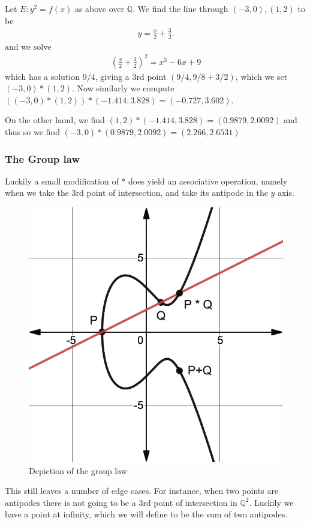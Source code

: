 \begin{counterexample} \label{counterexample:notAssociative}
  Let $E: y^2 = f(x)$ as above over $\mathbb{Q}$.
  We find the line through $(-3, 0), (1,2)$ to be
  \begin{align*}
    y = \frac{x}{2} + \frac{3}{2}.
  \end{align*}
  and we solve
  \begin{align*}
    \left(\frac{x}{2} + \frac{3}{2}\right)^2 = x^3 - 6x + 9
  \end{align*}
  which has a solution $9/4$, giving a 3rd point $(9/4, 9/8 + 3/2)$,
  which we set $(-3, 0) * (1, 2)$.  Now similarly we compute $((-3, 0) * (1,2)) * (-1.414, 3.828) = (-0.727,3.602)$.

  On the other hand, we find
  $ (1,2) * (-1.414, 3.828) = (0.9879, 2.0092) $
  and thus so we find $(-3, 0) * (0.9879, 2.0092) = (2.266, 2.6531)$
\end{counterexample}

\subsubsection{The Group law}%
\label{ssub:the_group_law}
Luckily a small modification of $*$ does yield an associative operation,
namely when we take the 3rd point of intersection, and take its
antipode in the $y$ axis.
\begin{figure}[H]
  \centering
  \includegraphics[width=0.5\linewidth]{ellipticCurves/ellipticCurveImage2.png}
  \caption{Depiction of the group law}%
  \label{fig:ellipticCurves/ellipticCurveImage2}
\end{figure}
This still leaves a number of edge cases.
For instance, when two points are antipodes
there is not going to be a 3rd point of intersection in $\mathbb{Q}^2$.
Luckily we have a point at infinity, which we will define
to be the sum of two antipodes.

